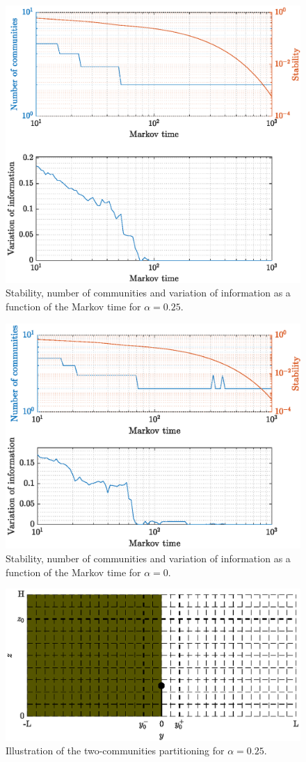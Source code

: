\begin{figure}[!htp]
	\centering
	\includegraphics[width = .7\textwidth, height = .4\textheight]{fig/problem2box/stab_a25.eps}
	\caption{Stability, number of communities and variation of information as a function of the Markov time for $\alpha = 0.25$.}
	\label{fig:staba25}
\end{figure}

\begin{figure}[!htp]
	\centering
	\includegraphics[width = .7\textwidth, height = .4\textheight]{fig/problem2box/stab_a0.eps}
	\caption{Stability, number of communities and variation of information as a function of the Markov time for $\alpha = 0$.}
	\label{fig:staba0}
\end{figure}

\begin{figure}[!htp]
	\centering
	\includegraphics[width = .7\textwidth]{fig/problem2box/cluster_a25_2_.eps}
	\caption{Illustration of the two-communities partitioning for $\alpha = 0.25$.}
	\label{fig:cluster_a25_2}
\end{figure}

